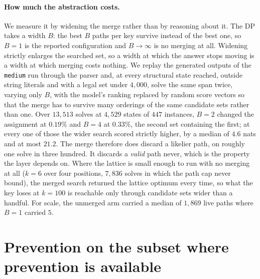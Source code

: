 \paragraph{How much the abstraction costs.}
We measure it by widening the merge rather than by reasoning about it. The DP
takes a width $B$: the best $B$ paths per key survive instead of the best one,
so $B{=}1$ is the reported configuration and $B\to\infty$ is no merging at all.
Widening strictly enlarges the searched set, so a width at which the answer stops
moving is a width at which merging costs nothing. We replay the generated outputs
of the \texttt{medium} run through the parser and, at every structural state
reached, outside string literals and with a legal set under $4{,}000$, solve
the same span twice, varying only $B$, with the model's ranking replaced by
random score vectors so that the merge has to survive many orderings of the same
candidate sets rather than one. Over $13{,}513$ solves at $4{,}529$ states of
$447$ instances, $B{=}2$ changed the assignment at $0.19\%$ and $B{=}4$ at
$0.33\%$, the second set containing the first; at every one of those the wider
search scored strictly higher, by a median of $4.6$ nats and at most $21.2$. The
merge therefore does discard a likelier path, on roughly one solve in three
hundred. It discards a \emph{valid} path never, which is the property the layer
depends on. Where the lattice is small enough to run with no merging at all
($k{=}6$ over four positions, $7{,}836$ solves in which the path cap never
bound), the merged search returned the lattice optimum every time, so what the
key loses at $k{=}100$ is reachable only through candidate sets wider than a
handful. For scale, the unmerged arm carried a median of $1{,}869$ live paths
where $B{=}1$ carried $5$.




\section{Prevention on the subset where prevention is available}
\label{app:prevention}

